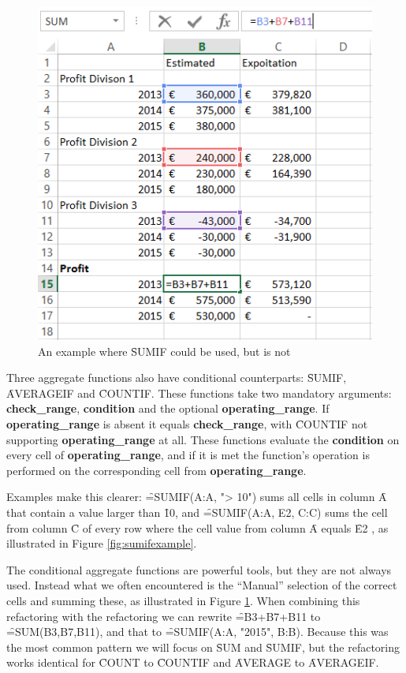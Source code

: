 \begin{figure}
	\centering
	\includegraphics{implementation/aggregate/condaggrexample}
	\caption{An example where \f{SUMIF} could be used, but is not}
	\label{fig:sumifcouldbeused}
\end{figure}

Three aggregate functions also have conditional counterparts: \f{SUMIF}, \f{AVERAGEIF} and \f{COUNTIF}.
These functions take two mandatory arguments: \textbf{check_range}, \textbf{condition} and the optional \textbf{operating_range}.
If \textbf{operating_range} is absent it equals \textbf{check_range}, with \f{COUNTIF} not supporting \textbf{operating_range} at all.
These functions evaluate the \textbf{condition} on every cell of \textbf{operating_range}, and if it is met the function's operation is performed on the corresponding cell from \textbf{operating_range}.

Examples make this clearer: \f{=SUMIF(A:A, "> 10")} sums all cells in column \f{A} that contain a value larger than \f{10}, and \f{=SUMIF(A:A, E2, C:C)} sums the cell from column \f{C} of every row where the cell value from column \f{A} equals \f{E2} , as illustrated in Figure \ref{fig:sumifexample}.

The conditional aggregate functions are powerful tools, but they are not always used. 
Instead what we often encountered is the ``Manual'' selection of the correct cells and summing these, as illustrated in Figure \ref{fig:sumifcouldbeused}.
When combining this refactoring with the  refactoring we can rewrite \f{=B3+B7+B11} to \f{=SUM(B3,B7,B11)}, and that to \f{=SUMIF(A:A, "2015", B:B)}.
Because this was the most common pattern we will focus on \f{SUM} and \f{SUMIF}, but the refactoring works identical for \f{COUNT} to \f{COUNTIF} and \f{AVERAGE} to \f{AVERAGEIF}.


